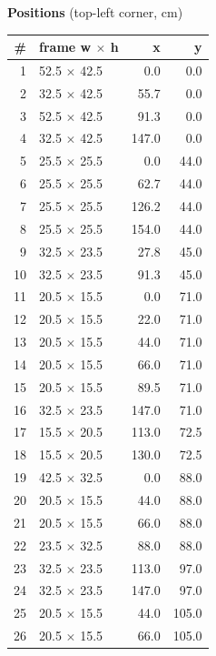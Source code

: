\documentclass[a4paper,landscape,10pt]{article}
\begin{document}
\begin{minipage}[t]{0.25\textwidth}
\vspace{8pt}
{\bfseries Positions} (top-left corner, cm)\\[2pt]
\tiny
\begin{tabular}{@{}r l r r@{}}
\toprule
\# & frame w $\times$ h & x & y \\
\midrule
1 & 52.5 $\times$ 42.5 & 0.0 & 0.0 \\
2 & 32.5 $\times$ 42.5 & 55.7 & 0.0 \\
3 & 52.5 $\times$ 42.5 & 91.3 & 0.0 \\
4 & 32.5 $\times$ 42.5 & 147.0 & 0.0 \\
5 & 25.5 $\times$ 25.5 & 0.0 & 44.0 \\
6 & 25.5 $\times$ 25.5 & 62.7 & 44.0 \\
7 & 25.5 $\times$ 25.5 & 126.2 & 44.0 \\
8 & 25.5 $\times$ 25.5 & 154.0 & 44.0 \\
9 & 32.5 $\times$ 23.5 & 27.8 & 45.0 \\
10 & 32.5 $\times$ 23.5 & 91.3 & 45.0 \\
11 & 20.5 $\times$ 15.5 & 0.0 & 71.0 \\
12 & 20.5 $\times$ 15.5 & 22.0 & 71.0 \\
13 & 20.5 $\times$ 15.5 & 44.0 & 71.0 \\
14 & 20.5 $\times$ 15.5 & 66.0 & 71.0 \\
15 & 20.5 $\times$ 15.5 & 89.5 & 71.0 \\
16 & 32.5 $\times$ 23.5 & 147.0 & 71.0 \\
17 & 15.5 $\times$ 20.5 & 113.0 & 72.5 \\
18 & 15.5 $\times$ 20.5 & 130.0 & 72.5 \\
19 & 42.5 $\times$ 32.5 & 0.0 & 88.0 \\
20 & 20.5 $\times$ 15.5 & 44.0 & 88.0 \\
21 & 20.5 $\times$ 15.5 & 66.0 & 88.0 \\
22 & 23.5 $\times$ 32.5 & 88.0 & 88.0 \\
23 & 32.5 $\times$ 23.5 & 113.0 & 97.0 \\
24 & 32.5 $\times$ 23.5 & 147.0 & 97.0 \\
25 & 20.5 $\times$ 15.5 & 44.0 & 105.0 \\
26 & 20.5 $\times$ 15.5 & 66.0 & 105.0 \\
\bottomrule
\end{tabular}
\end{minipage}
\clearpage
\end{document}
